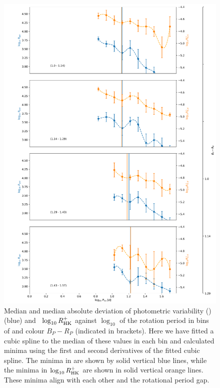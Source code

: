 \begin{figure}
\centering
  \includegraphics[width=\textwidth]{Figures/rot_gap_figures/rot_vs_rper_rhk_minima.png}
  \caption[Median and median absolute deviation of photometric variability (\rper{}) (blue) and \lamost\ $\log_{10}R^{+}_{\rm{HK}}$ against $\log_{10}$ of the rotation period in bins of and colour \gaia{} $B_P-R_P$.]{
  Median and median absolute deviation of photometric variability (\rper{}) (blue) and \lamost\ $\log_{10}R^{+}_{\rm{HK}}$ against $\log_{10}$ of the rotation period in bins of and colour \gaia{} $B_P-R_P$ (indicated in brackets). Here we have fitted a cubic spline to the median of these values in each bin and calculated minima using the first and second derivatives of the fitted cubic spline. The minima in \rper{} are shown by solid vertical blue lines, while the minima in $\log_{10}R^{+}_{\rm{HK}}$ are shown in solid vertical orange lines. These minima align with each other and the rotational period gap.}
  \label{fig:rot_rper_rhk}
\end{figure}

